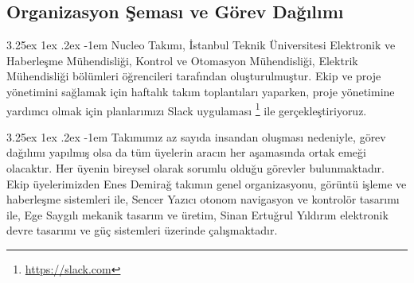 \documentclass[12pt]{article}
\makeatletter
\renewcommand\paragraph{\@startsection{paragraph}{5}{\z@}%
  {3.25ex \@plus1ex \@minus.2ex}%
  {-1em}%
  {\normalfont\normalsize\bfseries}}
\makeatother
\begin{document}
\begin{table}[h]
\centering
{}
\caption{Takım Üyeleri}
\label{tab:takim-uyeleri}
\end{table}

\subsection{Organizasyon Şeması ve Görev Dağılımı}

\paragraph{} Nucleo Takımı, İstanbul Teknik Üniversitesi Elektronik ve Haberleşme Mühendisliği, Kontrol ve Otomasyon Mühendisliği, Elektrik Mühendisliği bölümleri öğrencileri tarafından oluşturulmuştur. Ekip ve proje yönetimini sağlamak için haftalık takım toplantıları yaparken, proje yönetimine yardımcı olmak için planlarımızı Slack uygulaması \footnote{\href{https://slack.com/}{https://slack.com}} ile gerçekleştiriyoruz.

\paragraph{} Takımımız az sayıda insandan oluşması nedeniyle, görev dağılımı yapılmış olsa da tüm üyelerin aracın her aşamasında ortak emeği olacaktır. Her üyenin bireysel olarak sorumlu olduğu görevler bulunmaktadır. Ekip üyelerimizden Enes Demirağ takımın genel organizasyonu, görüntü işleme ve haberleşme sistemleri ile, Sencer Yazıcı otonom navigasyon ve kontrolör tasarımı ile, Ege Saygılı mekanik tasarım ve üretim, Sinan Ertuğrul Yıldırım elektronik devre tasarımı ve güç sistemleri üzerinde çalışmaktadır.
\end{document}
